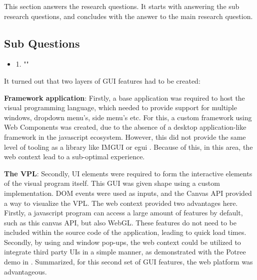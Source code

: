 This section answers the research questions. 
It starts with answering the sub research questions, and concludes with the answer to the main research question.

\subsection*{Sub Questions}

\begin{itemize}[ ]
  \item 1. "\myNewSubRQOne"
\end{itemize}

It turned out that two layers of \ac{GUI} features had to be created:

\textbf{Framework application}: Firstly, a base application was required to host the visual programming language, which needed to provide support for multiple windows, dropdown menu's, side menu's etc.
For this, a custom framework using Web Components was created, due to the absence of a desktop application-like framework in the javascript ecosystem. 
However, this did not provide the same level of tooling as a library like IMGUI \citep{cornut_dear_2022} or egui \citep{ernerfeldt_egui_2022}.
Because of this, in this area, the web context lead to a sub-optimal experience.

\textbf{The VPL}: Secondly, UI elements were required to form the interactive elements of the visual program itself. 
This GUI was given shape using a custom implementation. 
DOM events were used as inputs, and the Canvas API provided a way to visualize the VPL.
The web context provided two advantages here.
Firstly, a javascript program can access a large amount of features by default, such as this canvas API, but also WebGL. 
These features do not need to be included within the source code of the application, leading to quick load times. 
Secondly, by using  and window pop-ups, the web context could be utilized to integrate third party UIs in a simple manner, as demonstrated with the Potree demo in .
Summarized, for this second set of \ac{GUI} features, the web platform was advantageous.



